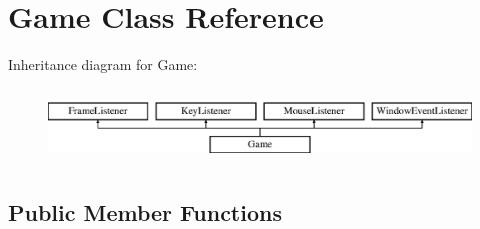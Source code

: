 \hypertarget{class_game}{}\section{Game Class Reference}
\label{class_game}
Inheritance diagram for Game\+:\begin{figure}[H]
\begin{center}
\leavevmode
\includegraphics[height=1.985816cm]{class_game}
\end{center}
\end{figure}
\subsection*{Public Member Functions}
